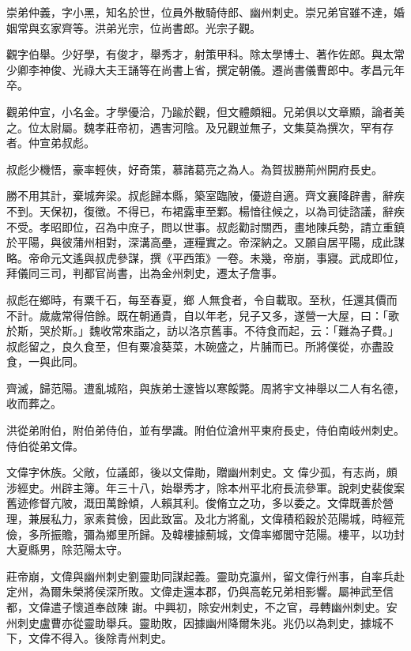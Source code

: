 \begin{pinyinscope}
 崇弟仲義，字小黑，知名於世，位員外散騎侍郎、幽州刺史。崇兄弟官雖不達，婚姻常與玄家齊等。洪弟光宗，位尚書郎。光宗子觀。



 觀字伯舉。少好學，有俊才，舉秀才，射策甲科。除太學博士、著作佐郎。與太常少卿李神俊、光祿大夫王誦等在尚書上省，撰定朝儀。遷尚書儀曹郎中。孝昌元年卒。



 觀弟仲宣，小名金。才學優洽，乃踰於觀，但文體頗細。兄弟俱以文章顯，論者美之。位太尉屬。魏孝莊帝初，遇害河陰。及兄觀並無子，文集莫為撰次，罕有存者。仲宣弟叔彪。



 叔彪少機悟，豪率輕俠，好奇策，慕諸葛亮之為人。為賀拔勝荊州開府長史。



 勝不用其計，棄城奔梁。叔彪歸本縣，築室臨陂，優遊自適。齊文襄降辟書，辭疾不到。天保初，復徵。不得已，布裙露車至鄴。楊愔往候之，以為司徒諮議，辭疾不受。孝昭即位，召為中庶子，問以世事。叔彪勸討關西，畫地陳兵勢，請立重鎮於平陽，與彼蒲州相對，深溝高壘，運糧實之。帝深納之。又願自居平陽，成此謀略。帝命元文遙與叔虎參謀，撰《平西策》一卷。未幾，帝崩，事寢。武成即位，拜儀同三司，判都官尚書，出為金州刺史，遷太子詹事。



 叔彪在鄉時，有粟千石，每至春夏，鄉
 人無食者，令自載取。至秋，任還其價而不計。歲歲常得倍餘。既在朝通貴，自以年老，兒子又多，遂營一大屋，曰：「歌於斯，哭於斯。」魏收常來詣之，訪以洛京舊事。不待食而起，云：「難為子費。」叔彪留之，良久食至，但有粟飡葵菜，木碗盛之，片脯而已。所將僕從，亦盡設食，一與此同。



 齊滅，歸范陽。遭亂城陷，與族弟士邃皆以寒餒斃。周將宇文神舉以二人有名德，收而葬之。



 洪從弟附伯，附伯弟侍伯，並有學識。附伯位滄州平東府長史，侍伯南岐州刺史。侍伯從弟文偉。



 文偉字休族。父敞，位議郎，後以文偉勛，贈幽州刺史。文
 偉少孤，有志尚，頗涉經史。州辟主簿。年三十八，始舉秀才，除本州平北府長流參軍。說刺史裴俊案舊迹修督亢陂，溉田萬餘傾，人賴其利。俊脩立之功，多以委之。文偉既善於營理，兼展私力，家素貧儉，因此致富。及北方將亂，文偉積稻穀於范陽城，時經荒儉，多所振贍，彌為鄉里所歸。及韓樓據薊城，文偉率鄉閭守范陽。樓平，以功封大夏縣男，除范陽太守。



 莊帝崩，文偉與幽州刺史劉靈助同謀起義。靈助克瀛州，留文偉行州事，自率兵赴定州，為爾朱榮將侯深所敗。文偉走還本郡，仍與高乾兄弟相影響。屬神武至信都，文偉遣子懷道奉啟陳
 謝。中興初，除安州刺史，不之官，尋轉幽州刺史。安州刺史盧曹亦從靈助舉兵。靈助敗，因據幽州降爾朱兆。兆仍以為刺史，據城不下，文偉不得入。後除青州刺史。




\end{pinyinscope}
